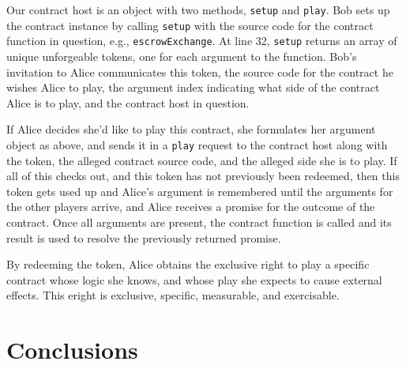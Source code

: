 \documentclass{llncs}
\begin{document}
Our contract host is an object with two methods, {\tt setup} and {\tt play}. Bob sets up the contract instance by calling {\tt setup} with the source code for the contract function in question, e.g., {\tt escrowExchange}. At line 32, {\tt setup} returns an array of unique unforgeable tokens, one for each argument to the function. Bob's invitation to Alice communicates this token, the source code for the contract he wishes Alice to play, the argument index indicating what side of the contract Alice is to play, and the contract host in question.

If Alice decides she'd like to play this contract, she formulates her argument object as above, and sends it in a {\tt play} request to the contract host along with the token, the alleged contract source code, and the alleged side she is to play. If all of this checks out, and this token has not previously been redeemed, then this token gets used up and Alice's argument is remembered until the arguments for the other players arrive, and Alice receives a promise for the outcome of the contract. Once all arguments are present, the contract function is called and its result is used to resolve the previously returned promise.

By redeeming the token, Alice obtains the exclusive right to play a specific contract whose logic she knows, and whose play she expects to cause external effects. This eright is exclusive, specific, measurable, and exercisable. 

\section{Conclusions}






% 

\end{document}
